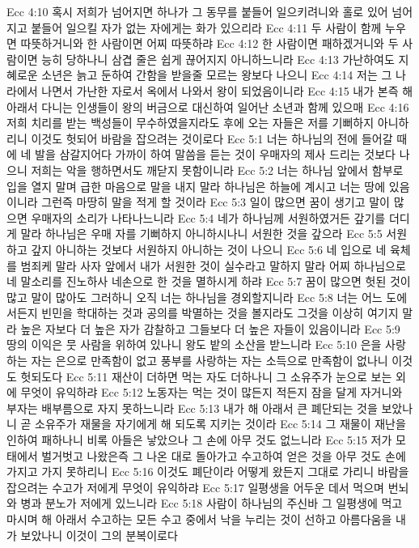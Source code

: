 Ecc 4:10  혹시 저희가 넘어지면 하나가 그 동무를 붙들어 일으키려니와 홀로 있어 넘어지고 붙들어 일으킬 자가 없는 자에게는 화가 있으리라
Ecc 4:11  두 사람이 함께 누우면 따뜻하거니와 한 사람이면 어찌 따뜻하랴
Ecc 4:12  한 사람이면 패하겠거니와 두 사람이면 능히 당하나니 삼겹 줄은 쉽게 끊어지지 아니하느니라
Ecc 4:13  가난하여도 지혜로운 소년은 늙고 둔하여 간함을 받을줄 모르는 왕보다 나으니
Ecc 4:14  저는 그 나라에서 나면서 가난한 자로서 옥에서 나와서 왕이 되었음이니라
Ecc 4:15  내가 본즉 해 아래서 다니는 인생들이 왕의 버금으로 대신하여 일어난 소년과 함께 있으매
Ecc 4:16  저희 치리를 받는 백성들이 무수하였을지라도 후에 오는 자들은 저를 기뻐하지 아니하리니 이것도 헛되어 바람을 잡으려는 것이로다
Ecc 5:1  너는 하나님의 전에 들어갈 때에 네 발을 삼갈지어다 가까이 하여 말씀을 듣는 것이 우매자의 제사 드리는 것보다 나으니 저희는 악을 행하면서도 깨닫지 못함이니라
Ecc 5:2  너는 하나님 앞에서 함부로 입을 열지 말며 급한 마음으로 말을 내지 말라 하나님은 하늘에 계시고 너는 땅에 있음이니라 그런즉 마땅히 말을 적게 할 것이라
Ecc 5:3  일이 많으면 꿈이 생기고 말이 많으면 우매자의 소리가 나타나느니라
Ecc 5:4  네가 하나님께 서원하였거든 갚기를 더디게 말라 하나님은 우매 자를 기뻐하지 아니하시나니 서원한 것을 갚으라
Ecc 5:5  서원하고 갚지 아니하는 것보다 서원하지 아니하는 것이 나으니
Ecc 5:6  네 입으로 네 육체를 범죄케 말라 사자 앞에서 내가 서원한 것이 실수라고 말하지 말라 어찌 하나님으로 네 말소리를 진노하사 네손으로 한 것을 멸하시게 하랴
Ecc 5:7  꿈이 많으면 헛된 것이 많고 말이 많아도 그러하니 오직 너는 하나님을 경외할지니라
Ecc 5:8  너는 어느 도에서든지 빈민을 학대하는 것과 공의를 박멸하는 것을 볼지라도 그것을 이상히 여기지 말라 높은 자보다 더 높은 자가 감찰하고 그들보다 더 높은 자들이 있음이니라
Ecc 5:9  땅의 이익은 뭇 사람을 위하여 있나니 왕도 밭의 소산을 받느니라
Ecc 5:10  은을 사랑하는 자는 은으로 만족함이 없고 풍부를 사랑하는 자는 소득으로 만족함이 없나니 이것도 헛되도다
Ecc 5:11  재산이 더하면 먹는 자도 더하나니 그 소유주가 눈으로 보는 외에 무엇이 유익하랴
Ecc 5:12  노동자는 먹는 것이 많든지 적든지 잠을 달게 자거니와 부자는 배부름으로 자지 못하느니라
Ecc 5:13  내가 해 아래서 큰 폐단되는 것을 보았나니 곧 소유주가 재물을 자기에게 해 되도록 지키는 것이라
Ecc 5:14  그 재물이 재난을 인하여 패하나니 비록 아들은 낳았으나 그 손에 아무 것도 없느니라
Ecc 5:15  저가 모태에서 벌거벗고 나왔은즉 그 나온 대로 돌아가고 수고하여 얻은 것을 아무 것도 손에 가지고 가지 못하리니
Ecc 5:16  이것도 폐단이라 어떻게 왔든지 그대로 가리니 바람을 잡으려는 수고가 저에게 무엇이 유익하랴
Ecc 5:17  일평생을 어두운 데서 먹으며 번뇌와 병과 분노가 저에게 있느니라
Ecc 5:18  사람이 하나님의 주신바 그 일평생에 먹고 마시며 해 아래서 수고하는 모든 수고 중에서 낙을 누리는 것이 선하고 아름다움을 내가 보았나니 이것이 그의 분복이로다
